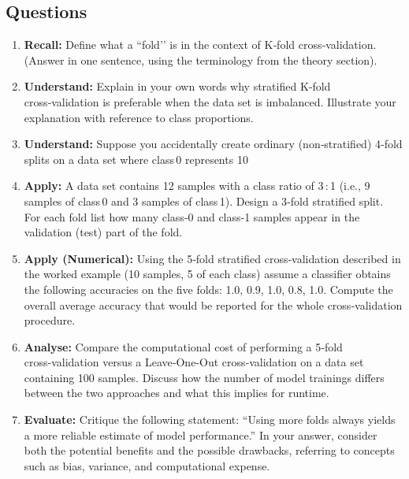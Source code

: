 \documentclass[12pt, a4paper]{article}
\begin{document}
\subsection*{Questions}
\begin{enumerate}
\item \textbf{Recall:} Define what a “fold’’ is in the context of K‑fold cross‑validation.  (Answer in one sentence, using the terminology from the theory section). \newpage
\item \textbf{Understand:} Explain in your own words why stratified K‑fold cross‑validation is preferable when the data set is imbalanced.  Illustrate your explanation with reference to class proportions. \newpage
\item \textbf{Understand:} Suppose you accidentally create ordinary (non‑stratified) 4‑fold splits on a data set where class 0 represents 10 %
\item \textbf{Apply:} A data set contains 12 samples with a class ratio of 3 : 1 (i.e., 9 samples of class 0 and 3 samples of class 1).  Design a 3‑fold stratified split.  For each fold list how many class‑0 and class‑1 samples appear in the validation (test) part of the fold. \newpage
\item \textbf{Apply (Numerical):} Using the 5‑fold stratified cross‑validation described in the worked example (10 samples, 5 of each class) assume a classifier obtains the following accuracies on the five folds: 1.0, 0.9, 1.0, 0.8, 1.0.  Compute the overall average accuracy that would be reported for the whole cross‑validation procedure. \newpage
\item \textbf{Analyse:} Compare the computational cost of performing a 5‑fold cross‑validation versus a Leave‑One‑Out cross‑validation on a data set containing 100 samples.  Discuss how the number of model trainings differs between the two approaches and what this implies for runtime. \newpage
\item \textbf{Evaluate:} Critique the following statement: “Using more folds always yields a more reliable estimate of model performance.”  In your answer, consider both the potential benefits and the possible drawbacks, referring to concepts such as bias, variance, and computational expense. \newpage
\end{enumerate}

\newpage
\end{document}
